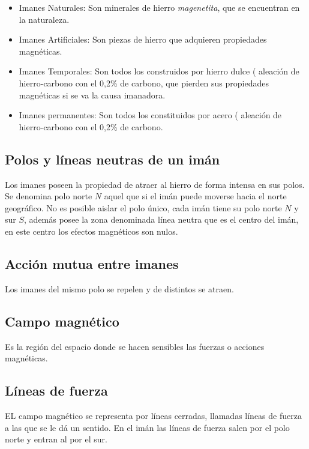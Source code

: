 \documentclass[../main]{subfiles}
\begin{document}
\begin{itemize}
    \item Imanes Naturales: Son minerales de hierro \emph{magenetita}, que se encuentran en la naturaleza.
    \item Imanes Artificiales: Son piezas de hierro que adquieren propiedades magnéticas.
    \item Imanes Temporales: Son todos los construidos por hierro dulce ( aleación de hierro-carbono con el 0,2\% de carbono, que pierden sus propiedades magnéticas si se va la causa imanadora.
    \item Imanes permanentes: Son todos los constituidos por acero ( aleación de hierro-carbono con el 0,2\% de carbono.
\end{itemize}





\subsection{Polos y líneas neutras de un imán}

Los imanes poseen la propiedad de atraer al hierro de forma intensa en sus polos. Se denomina polo norte $N$ aquel que si el imán puede moverse hacia el norte geográfico. No es posible aislar el polo único, cada imán tiene su polo norte $N$ y sur $S$, además posee la zona denominada línea neutra que es el centro del imán, en este centro los efectos magnéticos son nulos.

\subsection{Acción mutua entre imanes}

Los imanes del mismo polo se repelen y de distintos se atraen.

\subsection{Campo magnético}

Es la región del espacio donde se hacen sensibles las fuerzas o acciones magnéticas.

\subsection{Líneas de fuerza}

EL campo magnético se representa por líneas cerradas, llamadas líneas de fuerza a las que se le dá un sentido. En el imán las líneas de fuerza salen por el polo norte y entran al por el sur.
\end{document}
